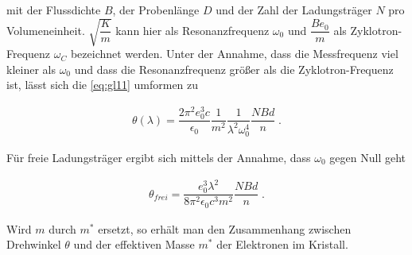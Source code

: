    mit der Flussdichte $B$, der Probenlänge $D$ und der Zahl der Ladungsträger $N$ pro Volumeneinheit. $\sqrt{\dfrac{K}{m}}$
    kann hier als Resonanzfrequenz $\omega_0$ und $\dfrac{Be_0}{m}$ als Zyklotron-Frequenz $\omega_C$ bezeichnet werden. 
    Unter der Annahme, dass die Messfrequenz viel kleiner als $\omega_0$ und dass die Resonanzfrequenz größer als die Zyklotron-Frequenz ist,
    lässt sich die \autoref{eq:gl11} umformen zu

    \begin{align*}
    \theta(\lambda)=\dfrac{2\pi^2 e_0^3 c}{\epsilon_0}\dfrac{1}{m^2}\dfrac{1}{\lambda^2 \omega_0^4}\dfrac{NBd}{n}\; .
    \end{align*}

    Für freie Ladungsträger ergibt sich mittels der Annahme, dass $\omega_0$ gegen Null geht

    \begin{align}
    \label{eqn:gl12}
    \theta_{frei}=\dfrac{e_0^3\lambda^2}{8 \pi^2 \epsilon_0 c^3 m^2 }\dfrac{NBd}{n}\; .
    \end{align}

    Wird $m$ durch $m^*$ ersetzt, so erhält man den Zusammenhang zwischen Drehwinkel $\theta$ und der effektiven Masse $m^*$
    der Elektronen im Kristall.

    \newpage